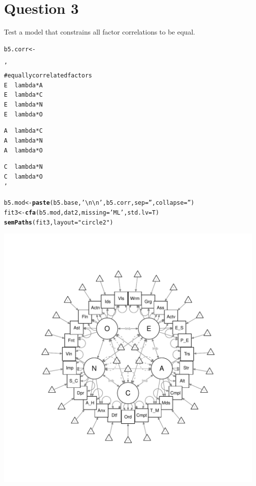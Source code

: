 \documentclass{article}\usepackage[]{graphicx}\usepackage[]{color}
\makeatletter
\def\maxwidth{ %
  \ifdim\Gin@nat@width>\linewidth
    \linewidth
  \else
    \Gin@nat@width
  \fi
}
\newcommand{\hlstr}[1]{\textcolor[rgb]{0.192,0.494,0.8}{#1}}%
\newcommand{\hlstd}[1]{\textcolor[rgb]{0.345,0.345,0.345}{#1}}%
\newcommand{\hlkwb}[1]{\textcolor[rgb]{0.69,0.353,0.396}{#1}}%
\newcommand{\hlkwc}[1]{\textcolor[rgb]{0.333,0.667,0.333}{#1}}%
\newcommand{\hlkwd}[1]{\textcolor[rgb]{0.737,0.353,0.396}{\textbf{#1}}}%
\newenvironment{kframe}{%
 \def\at@end@of@kframe{}%
 \ifinner\ifhmode%
  \def\at@end@of@kframe{\end{minipage}}%
  \begin{minipage}{\columnwidth}%
 \fi\fi%
 \def\FrameCommand##1{\hskip\@totalleftmargin \hskip-\fboxsep
 \colorbox{shadecolor}{##1}\hskip-\fboxsep
     \hskip-\linewidth \hskip-\@totalleftmargin \hskip\columnwidth}%
 \MakeFramed {\advance\hsize-\width
   \@totalleftmargin\z@ \linewidth\hsize
   \@setminipage}}%
 {\par\unskip\endMakeFramed%
 \at@end@of@kframe}
\newenvironment{knitrout}{}{} %
\makeatother
\begin{document}
\section{Question 3}
Test a model that constrains all factor correlations to be equal.  
\begin{knitrout}
\color{fgcolor}\begin{kframe}
\begin{alltt}
\hlstd{b5.corr} \hlkwb{<-} \hlstr{'
# equally correlated factors
E ~~ lambda*A
E ~~ lambda*C
E ~~ lambda*N
E ~~ lambda*O

A ~~ lambda*C
A ~~ lambda*N
A ~~ lambda*O

C ~~ lambda*N
C ~~ lambda*O
'}

\hlstd{b5.mod} \hlkwb{<-} \hlkwd{paste}\hlstd{(b5.base,} \hlstr{'\textbackslash{}n\textbackslash{}n'}\hlstd{, b5.corr,} \hlkwc{sep} \hlstd{=} \hlstr{''}\hlstd{,} \hlkwc{collapse} \hlstd{=} \hlstr{''}\hlstd{)}
\hlstd{fit3} \hlkwb{<-} \hlkwd{cfa}\hlstd{(b5.mod, dat2,} \hlkwc{missing} \hlstd{=} \hlstr{'ML'}\hlstd{,} \hlkwc{std.lv} \hlstd{= T)}
\hlkwd{semPaths}\hlstd{(fit3,} \hlkwc{layout} \hlstd{=} \hlstr{"circle2"}\hlstd{)}
\end{alltt}
\end{kframe}
\includegraphics[width=\maxwidth]{figure/unnamed-chunk-9-1} 

\end{knitrout}
\end{document}
